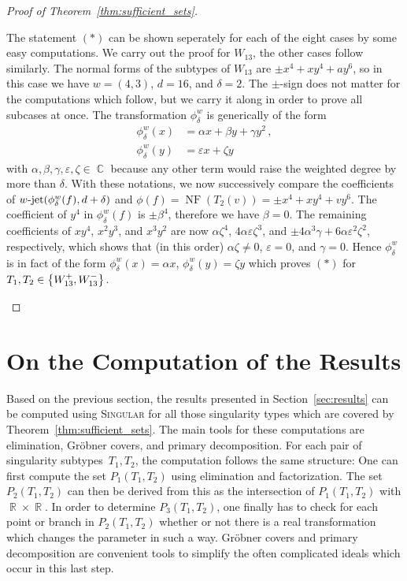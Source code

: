 \documentclass[noend]{amsproc}
\theoremstyle{definition}
\let\originalleft\left
\let\originalright\right
\renewcommand{\left}{\mathopen{}\mathclose\bgroup\originalleft}
\renewcommand{\right}{\aftergroup\egroup\originalright}
\newcommand{\Singular}{\textsc{Singular}}
\DeclareMathOperator{\R}{\mathbb{R}}
\DeclareMathOperator{\C}{\mathbb{C}}
\DeclareMathOperator{\NF}{NF}
\DeclareMathOperator{\dash}{\!\textnormal{-}\!}
\DeclareMathOperator{\jet}{jet}
\begin{document}
\begin{proof}[Proof of Theorem~\ref{thm:sufficient_sets}]
\begin{description}[font=\normalfont\itshape,%
leftmargin=0cm,labelindent=\parindent]
The statement $(\ast)$ can be shown seperately for each of the eight cases by
some easy computations. We carry out the proof for $W_{13}$, the other cases
follow similarly. The normal forms of the subtypes of $W_{13}$ are
$\pm x^4+xy^4+ay^6$, so in this case we have $w = (4,3)$, $d = 16$, and
$\delta = 2$. The $\pm$-sign does not matter for the computations which follow,
but we carry it along in order to prove all subcases at once. The
transformation $\phi_\delta^w$ is generically of the form
\begin{align*}
\phi_\delta^w(x) &= \alpha x + \beta y + \gamma y^2 \,, \\
\phi_\delta^w(y) &= \varepsilon x + \zeta y
\end{align*}
with $\alpha, \beta, \gamma, \varepsilon, \zeta \in \C$ because any other term
would raise the weighted degree by more than $\delta$. With these notations, we
now successively compare the coefficients of
$w\dash\jet(\phi_\delta^w(f), d+\delta)$ and
$\phi(f) = \NF(T_2(v)) = \pm x^4+xy^4+vy^6$. The coefficient of $y^4$ in
$\phi_\delta^w(f)$ is $\pm \beta^4$, therefore we have $\beta = 0$. The
remaining coefficients of $xy^4$, $x^2y^3$, and $x^3y^2$ are now
$\alpha\zeta^4$, $4\alpha\varepsilon\zeta^3$, and
$\pm 4\alpha^3\gamma+6\alpha\varepsilon^2\zeta^2$, respectively, which shows
that (in this order) $\alpha\zeta \neq 0$, $\varepsilon = 0$, and $\gamma = 0$.
Hence $\phi_\delta^w$ is in fact of the form
$\phi_\delta^w(x) = \alpha x$, $\phi_\delta^w(y) = \zeta y$ which proves
$(\ast)$ for $T_1, T_2 \in \left\{W_{13}^+, W_{13}^-\right\}$.
\end{description}
\end{proof}


\section{On the Computation of the Results}\label{sec:computations}

Based on the previous section, the results presented in
Section~\ref{sec:results} can be computed using \Singular{} for all those
singularity types which are covered by Theorem~\ref{thm:sufficient_sets}. The
main tools for these computations are elimination, Gr\"obner covers, and
primary decomposition. For each pair of singularity subtypes~$T_1, T_2$, the
computation follows the same structure: One can first compute the set
$P_1(T_1, T_2)$ using elimination and factorization. The set $P_2(T_1, T_2)$
can then be derived from this as the intersection of $P_1(T_1, T_2)$ with
$\R \times \R$. In order to determine $P_3(T_1, T_2)$, one finally has to check
for each point or branch in $P_2(T_1, T_2)$ whether or not there is a real
transformation which changes the parameter in such a way. Gr\"obner covers and
primary decomposition are convenient tools to simplify the often complicated
ideals which occur in this last step.
\end{document}
